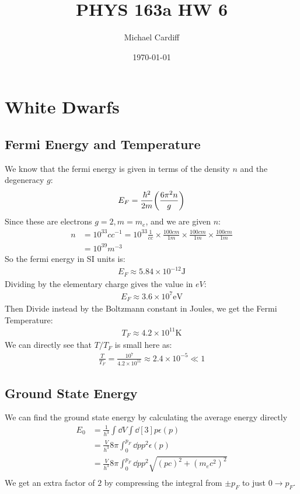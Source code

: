 \documentclass[12pt]{article}
\title{\vspace{-3em}PHYS 163a HW 6}
\author{Michael Cardiff}
\date{\today}
\begin{document}
\maketitle

\section{White Dwarfs}
\subsection{Fermi Energy and Temperature}
We know that the fermi energy is given in terms of the density $n$ and the degeneracy $g$:
\begin{align*}
  E_F=\frac{\hbar^2}{2m}\qty(\frac{6\pi^2 n}{g})
\end{align*}
Since these are electrons $g=2,m=m_e$, and we are given $n$:
\begin{align*}
  n&=10^{33}{cc}^{-1}=10^{33}\frac{1}{cc}
  \times\frac{100cm}{1m}\times\frac{100cm}{1m}\times\frac{100cm}{1m}\\
  &=10^{39}m^{-3}
\end{align*}
So the fermi energy in SI units is:
\begin{align*}
  E_F\approx5.84\times10^{-12}\text{J}
\end{align*}
Dividing by the elementary charge gives the value in $eV$:
\begin{align}
  \boxed{E_F\approx3.6\times10^7\text{eV}}
\end{align}
Then Divide instead by the Boltzmann constant in Joules, we get the Fermi Temperature:
\begin{align}
  \boxed{T_F\approx4.2\times10^{11}\text{K}}
\end{align}
We can directly see that $T/T_F$ is small here as:
\begin{align*}
  \frac{T}{T_F}=\frac{10^7}{4.2\times10^{11}}\approx2.4\times10^{-5}\ll 1
\end{align*}
\subsection{Ground State Energy}
We can find the ground state energy by calculating the average energy directly
\begin{align*}
  E_0&=\frac1{h^3}\int\dd{V}\int\dd[3]{p}\epsilon(p)\\
  &=\frac{V}{h^3}8\pi\int_0^{p_F}\dd{p}p^2\epsilon(p)\\
  &=\frac{V}{h^3}8\pi\int_0^{p_F}\dd{p}p^2\sqrt{(pc)^2+(m_ec^2)^2}\\
\end{align*}
We get an extra factor of $2$ by compressing the integral from $\pm p_F$ to just $0\to p_F$.
\end{document}

